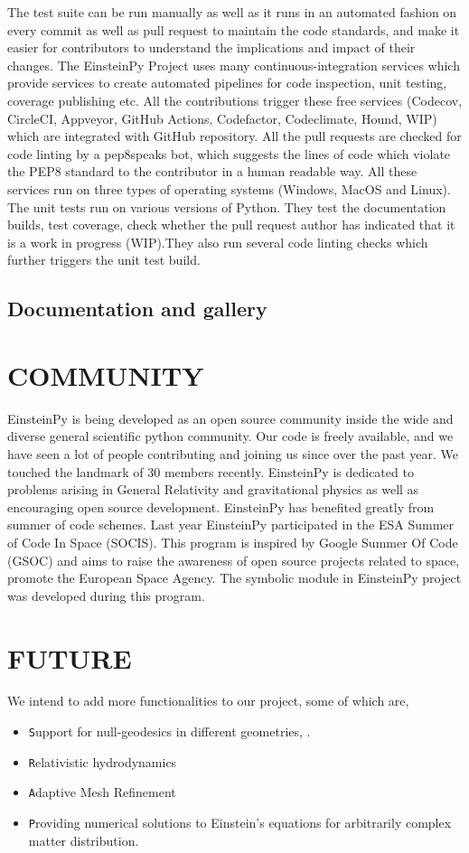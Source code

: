 \documentclass{aastex63}
\begin{document}
The test suite can be run manually as well as it runs in an automated fashion on every commit as well as pull request to maintain the code standards, and make it easier for contributors to understand the implications and impact of their changes. The EinsteinPy Project uses many continuous-integration services which provide services to create automated pipelines for code inspection, unit testing, coverage publishing etc. All the contributions trigger these free services (Codecov, CircleCI, Appveyor, GitHub Actions, Codefactor, Codeclimate, Hound, WIP) which are integrated with GitHub repository. All the pull requests are checked for code linting by a pep8speaks bot, which suggests the lines of code which violate the PEP8 standard to the contributor in a human readable way. All these services run on three types of operating systems (Windows, MacOS and Linux). The unit tests run on various versions of Python. They test the documentation builds, test coverage, check whether the pull request author has indicated that it is a work in progress (WIP).They also run several code linting checks which further triggers the unit test build.

\subsection{ Documentation and gallery} \label{subsec:  Documentation and gallery}

\section{COMMUNITY} \label{sec:COMMUNITY}
EinsteinPy is being developed as an open source community inside the wide and diverse general scientific python community. Our code is freely available, and we have seen a lot of people contributing and joining us since over the past year.
We touched the landmark of 30 members recently. EinsteinPy is dedicated to problems arising in General Relativity and gravitational physics as well as encouraging open source development. EinsteinPy has benefited greatly from summer of code schemes. Last year EinsteinPy participated in the ESA Summer of Code In Space (SOCIS). This program is inspired by Google Summer Of Code (GSOC) and aims to raise the awareness of open source projects related to space, promote the European Space Agency. The symbolic module in EinsteinPy project was developed during this program.

\section{FUTURE} \label{sec:FUTURE}
We intend to add more functionalities to our project, some of which are, 
\begin{itemize}
\item \texttt Support for null-geodesics in different geometries, . 
\item \texttt Relativistic hydrodynamics
\item \texttt Adaptive Mesh Refinement 
\item \texttt Providing numerical solutions to Einstein’s equations for arbitrarily complex matter distribution.
\end{itemize}
\end{document}
